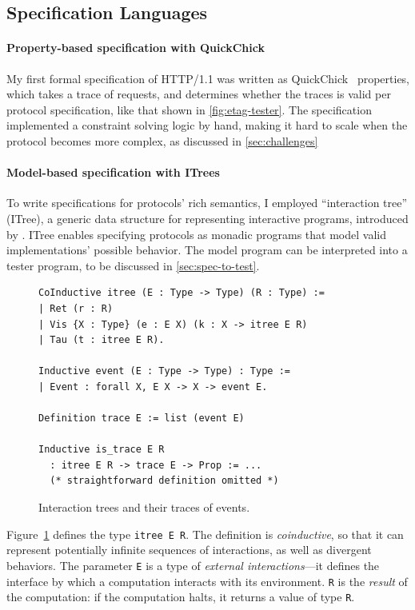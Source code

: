 \documentclass{article}
\newcommand{\http}{HTTP/1.1\xspace}
\newcommand{\ilc}[1]{\lstinline[style=customcoq]{#1}}
\theoremstyle{definition}
\begin{document}
\subsection{Specification Languages}

\paragraph{Property-based specification with QuickChick}
My first formal specification of \http was written as
QuickChick~\cite{quickchick} properties, which takes a trace of requests, and
determines whether the traces is valid per protocol specification, like that
shown in \autoref{fig:etag-tester}.  The specification implemented a constraint
solving logic by hand, making it hard to scale when the protocol becomes more
complex, as discussed in \autoref{sec:challenges}

\paragraph{Model-based specification with ITrees}
To write specifications for protocols' rich semantics, I employed ``interaction
tree'' (ITree), a generic data structure for representing interactive programs,
introduced by \textcite{itree}.  ITree enables specifying protocols as monadic
programs that model valid implementations' possible behavior.  The model program
can be interpreted into a tester program, to be discussed in
\autoref{sec:spec-to-test}.

\begin{figure}
  \begin{lstlisting}[style=customcoq]
CoInductive itree (E : Type -> Type) (R : Type) :=
| Ret (r : R)
| Vis {X : Type} (e : E X) (k : X -> itree E R)
| Tau (t : itree E R).

Inductive event (E : Type -> Type) : Type :=
| Event : forall X, E X -> X -> event E.

Definition trace E := list (event E)

Inductive is_trace E R
  : itree E R -> trace E -> Prop := ...
  (* straightforward definition omitted *)
 \end{lstlisting}
  \caption{Interaction trees and their traces of events.}
  \label{fig:itrees}
\end{figure}

Figure~\ref{fig:itrees} defines the type \ilc{itree E R}.  The definition is
\textit{coinductive}, so that it can represent potentially infinite sequences of
interactions, as well as divergent behaviors.  The parameter \ilc{E} is a type
of \textit{external interactions}---it defines the interface by which a
computation interacts with its environment.  \ilc{R} is the \textit{result} of
the computation: if the computation halts, it returns a value of type \ilc{R}.
\end{document}
